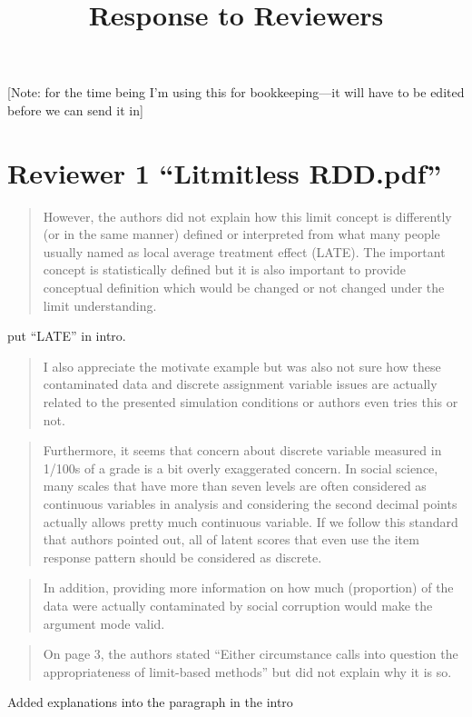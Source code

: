 \documentclass[12pt]{article}
\title{Response to Reviewers}
\begin{document}
\maketitle

[Note: for the time being I'm using this for bookkeeping---it will
have to be edited before we can send it in]\\

\section{Reviewer 1 ``Litmitless RDD.pdf''}

\begin{quote}
However, the authors did not explain how this limit concept is
differently (or in the same manner) defined or interpreted from what
many people usually named as local average treatment effect
(LATE). The important concept is statistically defined but it is also
important to provide conceptual definition which would be changed or
not changed under the limit understanding.
\end{quote}

put ``LATE'' in intro.

\begin{quote}
I also appreciate the motivate example but was also not sure how these
contaminated data and discrete assignment variable issues are actually
related to the presented simulation conditions or authors even tries
this or not.
\end{quote}

\begin{quote}
Furthermore, it seems that concern about discrete variable measured in
1/100s of a grade is a bit overly exaggerated concern. In social
science, many scales that have more than seven levels are often
considered as continuous variables in analysis and considering the
second decimal points actually allows pretty much continuous
variable. If we follow this standard that authors pointed out, all of
latent scores that even use the item response pattern should be
considered as discrete.
\end{quote}

\begin{quote}
In addition, providing more information on how much (proportion) of
the data were actually contaminated by social corruption would make
the argument mode valid.
\end{quote}

\begin{quote}
On page 3, the authors stated “Either circumstance calls into question
the appropriateness of limit-based methods” but did not explain why it
is so.
\end{quote}
Added explanations into the paragraph in the intro
\end{document}
